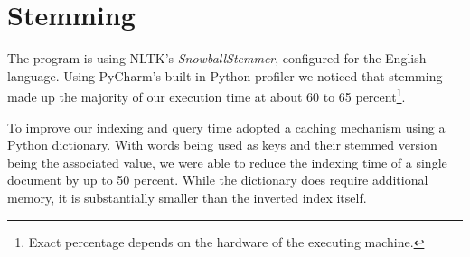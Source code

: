 \section{Stemming}
\label{sec:stemming}

The program is using NLTK's \textit{SnowballStemmer}, configured for the English language.
Using PyCharm's built-in Python profiler we noticed that stemming made up the majority of our execution time at about 60 to 65 percent\footnote{Exact percentage depends on the hardware of the executing machine.}.

To improve our indexing and query time adopted a caching mechanism using a Python dictionary.
With words being used as keys and their stemmed version being the associated value, we were able to reduce the indexing time of a single document by up to 50 percent.
While the dictionary does require additional memory, it is substantially smaller than the inverted index itself.
